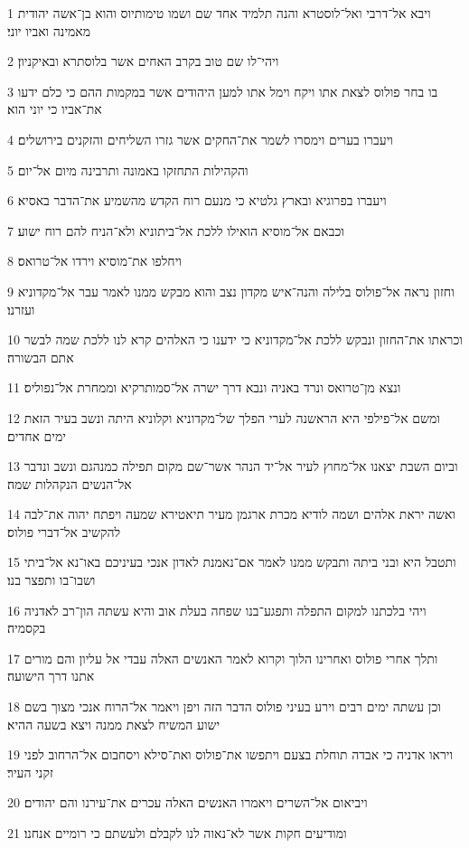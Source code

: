 \par 1 ויבא אל־דרבי ואל־לוסטרא והנה תלמיד אחד שם ושמו טימותיוס והוא בן־אשה יהודית מאמינה ואביו יוני׃
\par 2 ויהי־לו שם טוב בקרב האחים אשר בלוסתרא ובאיקניון׃
\par 3 בו בחר פולוס לצאת אתו ויקח וימל אתו למען היהודים אשר במקמות ההם כי כלם ידעו את־אביו כי יוני הוא׃
\par 4 ויעברו בערים וימסרו לשמר את־החקים אשר גזרו השליחים והזקנים בירושלים׃
\par 5 והקהילות התחזקו באמונה ותרבינה מיום אל־יום׃
\par 6 ויעברו בפרוגיא ובארץ גלטיא כי מנעם רוח הקדש מהשמיע את־הדבר באסיא׃
\par 7 וכבאם אל־מוסיא הואילו ללכת אל־ביתוניא ולא־הניח להם רוח ישוע׃
\par 8 ויחלפו את־מוסיא וירדו אל־טרואס׃
\par 9 וחזון נראה אל־פולוס בלילה והנה־איש מקדון נצב והוא מבקש ממנו לאמר עבר אל־מקדוניא ועזרנו׃
\par 10 וכראתו את־החזון ונבקש ללכת אל־מקדוניא כי ידענו כי האלהים קרא לנו ללכת שמה לבשר אתם הבשורה׃
\par 11 ונצא מן־טרואס ונרד באניה ונבא דרך ישרה אל־סמותרקיא וממחרת אל־נפוליס׃
\par 12 ומשם אל־פילפי היא הראשנה לערי הפלך של־מקדוניא וקלוניא היתה ונשב בעיר הזאת ימים אחדים׃
\par 13 וביום השבת יצאנו אל־מחוץ לעיר אל־יד הנהר אשר־שם מקום תפילה כמנהגם ונשב ונדבר אל־הנשים הנקהלות שמה׃
\par 14 ואשה יראת אלהים ושמה לודיא מכרת ארגמן מעיר תיאטירא שמעה ויפתח יהוה את־לבה להקשיב אל־דברי פולוס׃
\par 15 ותטבל היא ובני ביתה ותבקש ממנו לאמר אם־נאמנת לאדון אנכי בעיניכם באו־נא אל־ביתי ושבו־בו ותפצר בנו׃
\par 16 ויהי בלכתנו למקום התפלה ותפגע־בנו שפחה בעלת אוב והיא עשתה הון־רב לאדניה בקסמיה׃
\par 17 ותלך אחרי פולוס ואחרינו הלוך וקרוא לאמר האנשים האלה עבדי אל עליון והם מורים אתנו דרך הישועה׃
\par 18 וכן עשתה ימים רבים וירע בעיני פולוס הדבר הזה ויפן ויאמר אל־הרוח אנכי מצוך בשם ישוע המשיח לצאת ממנה ויצא בשעה ההיא׃
\par 19 ויראו אדניה כי אבדה תוחלת בצעם ויתפשו את־פולוס ואת־סילא ויסחבום אל־הרחוב לפני זקני העיר׃
\par 20 ויביאום אל־השרים ויאמרו האנשים האלה עכרים את־עירנו והם יהודים׃
\par 21 ומודיעים חקות אשר לא־נאוה לנו לקבלם ולעשתם כי רומיים אנחנו׃
